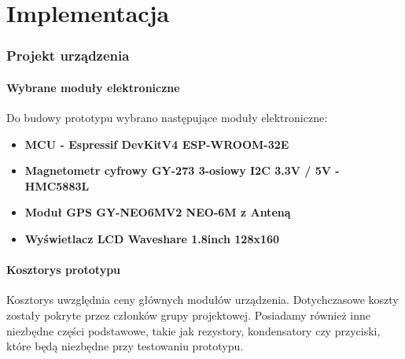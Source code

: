 \part{Implementacja}

\section{Projekt urządzenia}
\subsection{Wybrane moduły elektroniczne}
Do budowy prototypu wybrano następujące moduły elektroniczne:
\begin{itemize}
    \item \textbf{MCU - Espressif DevKitV4 ESP-WROOM-32E}
    \item \textbf{Magnetometr cyfrowy GY-273 3-osiowy I2C 3.3V / 5V - HMC5883L}
    \item \textbf{Moduł GPS GY-NEO6MV2 NEO-6M z Anteną}
    \item \textbf{Wyświetlacz LCD Waveshare 1.8inch 128x160}
\end{itemize}

\subsection{Kosztorys prototypu}
Kosztorys uwzględnia ceny głównych modułów urządzenia. Dotychczasowe koszty zostały pokryte przez członków grupy projektowej. Posiadamy również inne niezbędne części podstawowe, takie jak rezystory, kondensatory czy przyciski, które będą niezbędne przy testowaniu prototypu.

